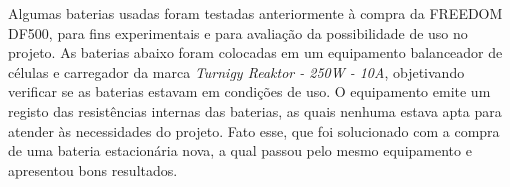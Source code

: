 

		 Algumas baterias usadas foram testadas anteriormente à compra da FREEDOM DF500, para fins experimentais e para avaliação da possibilidade de uso no projeto. As baterias abaixo foram colocadas em um equipamento balanceador de células e carregador da marca \textit{Turnigy Reaktor - 250W - 10A}, objetivando verificar se as baterias estavam em condições de uso. O equipamento emite um registo das resistências internas das baterias, as quais nenhuma estava apta para atender às necessidades do projeto. Fato esse, que foi solucionado com a compra de uma bateria estacionária nova, a qual passou pelo mesmo equipamento e apresentou bons resultados.


